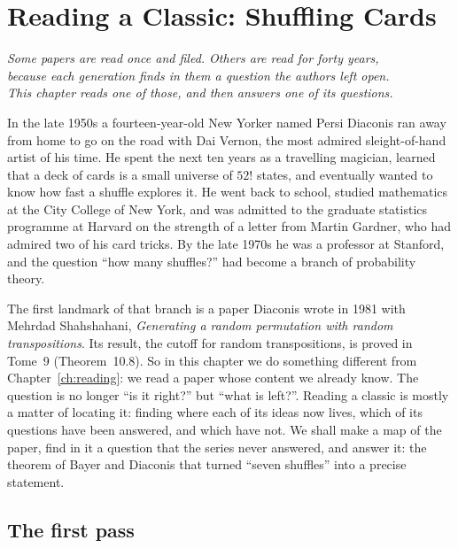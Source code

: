 \chapter{Reading a Classic: Shuffling Cards}
\label{ch:shuffling}

\begin{center}\itshape
Some papers are read once and filed. Others are read for forty years,\\
because each generation finds in them a question the authors left open.\\
This chapter reads one of those, and then answers one of its questions.
\end{center}

In the late 1950s a fourteen-year-old New Yorker named Persi Diaconis ran away from home to go on the road with Dai Vernon, the most
admired sleight-of-hand artist of his time. He spent the next ten years as a travelling magician, learned that a deck of cards is a
small universe of $52!$ states, and eventually wanted to know how fast a shuffle explores it. He went back to school, studied
mathematics at the City College of New York, and was admitted to the graduate statistics programme at Harvard on the strength of a letter
from Martin Gardner, who had admired two of his card tricks. By the late 1970s he was a professor at Stanford, and the question ``how many
shuffles?'' had become a branch of probability theory.

The first landmark of that branch is a paper Diaconis wrote in 1981 with Mehrdad Shahshahani, \emph{Generating a random permutation with random
transpositions}. Its result, the cutoff for random transpositions, is proved in Tome~9 (Theorem~10.8). So in this chapter we do something
different from Chapter~\ref{ch:reading}: we read a paper whose content we already know. The question is no longer ``is it right?'' but ``what is
left?''. Reading a classic is mostly a matter of locating it: finding where each of its ideas now lives, which of its questions have been
answered, and which have not. We shall make a map of the paper, find in it a question that the series never answered, and answer it: the
theorem of Bayer and Diaconis that turned ``seven shuffles'' into a precise statement.

\section{The first pass}

